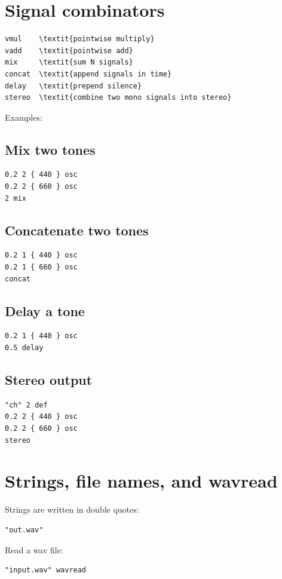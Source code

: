 \documentclass[11pt]{article}
\begin{document}
\section*{Signal combinators}
\begin{lstlisting}
vmul    \textit{pointwise multiply}
vadd    \textit{pointwise add}
mix     \textit{sum N signals}
concat  \textit{append signals in time}
delay   \textit{prepend silence}
stereo  \textit{combine two mono signals into stereo}
\end{lstlisting}

Examples:
\subsection*{Mix two tones}
\begin{lstlisting}
0.2 2 { 440 } osc
0.2 2 { 660 } osc
2 mix
\end{lstlisting}

\subsection*{Concatenate two tones}
\begin{lstlisting}
0.2 1 { 440 } osc
0.2 1 { 660 } osc
concat
\end{lstlisting}

\subsection*{Delay a tone}
\begin{lstlisting}
0.2 1 { 440 } osc
0.5 delay
\end{lstlisting}

\subsection*{Stereo output}
\begin{lstlisting}
"ch" 2 def
0.2 2 { 440 } osc
0.2 2 { 660 } osc
stereo
\end{lstlisting}

\section*{Strings, file names, and wavread}
Strings are written in double quotes:
\begin{lstlisting}
"out.wav"
\end{lstlisting}

Read a wav file:
\begin{lstlisting}
"input.wav" wavread
\end{lstlisting}
\end{document}
